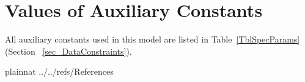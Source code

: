 \documentclass[12pt]{article}
\begin{document}





\section{Values of Auxiliary Constants}

All auxiliary constants used in this model are listed in Table~\ref{TblSpecParams} 
(Section ~\ref{sec_DataConstraints}).


\newpage

 {plainnat}
 {../../refs/References}


\end{document}
